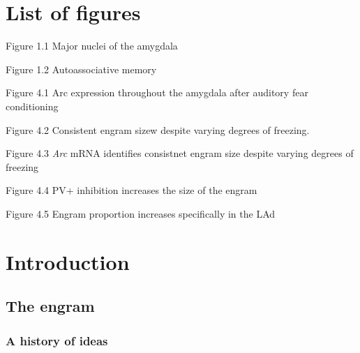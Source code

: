 \documentclass[12pt,a4paperpaper,]{report}
\begin{document}
\newpage

\tableofcontents

\chapter*{List of figures}\label{list-of-figures}

Figure 1.1 Major nuclei of the amygdala 

\noindent
Figure 1.2 Autoassociative memory 

\noindent
Figure 4.1 Arc expression throughout the amygdala after auditory fear
conditioning 

\noindent
Figure 4.2 Consistent engram sizew despite varying degrees of freezing.

\noindent
Figure 4.3 \emph{Arc} mRNA identifies consistnet engram size despite
varying degrees of freezing 

\noindent
Figure 4.4 PV+ inhibition increases the size of the engram 

\noindent
Figure 4.5 Engram proportion increases specifically in the LAd

\chapter{Introduction}\label{introduction}

\section{The engram}\label{the-engram}

\subsection{A history of ideas}\label{a-history-of-ideas}
\end{document}
